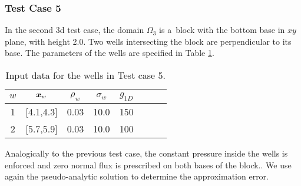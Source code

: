 \subsubsection{Test Case 5}
In the second 3d test case, the domain $\Omega_3$ is a~block with the bottom base in $xy$ plane,
with height 2.0.
Two wells intersecting the block are perpendicular to its base.
The parameters of the wells are specified in Table \ref{tab:tc5_data}.

\begin{table}[!hb]
\begin{center}
\begin{tabular}{cccccccc}
\toprule
$w$ & $\mathbf{\boldsymbol{x}}_w$  & $\rho_w$ & $\sigma_w$ & $g_{1D}$\\
\midrule
1& [4.1,4.3] & 0.03 & 10.0 & 150 \\
2& [5.7,5.9] & 0.03 & 10.0 & 100 \\
\bottomrule
\end{tabular}
\caption{Input data for the wells in Test case 5.}
\label{tab:tc5_data}
\end{center}
\end{table}
%
Analogically to the previous test case, the constant pressure inside the wells is enforced
and zero normal flux is prescribed on both bases of the block..
We use again the pseudo-analytic solution to determine the approximation error.

